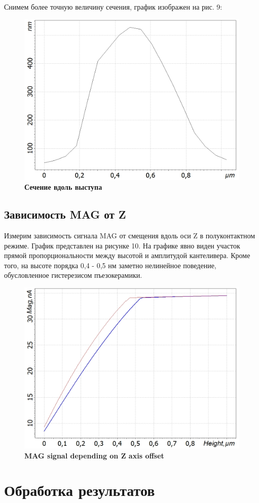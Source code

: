 \documentclass[a4paper]{article}
\begin{document}
Снимем более точную величину сечения, график изображен на рис. 9:

 \begin{figure}[H]
\centering
	\includegraphics[width=0.6\linewidth]{curve3.jpg}
		\caption{{\bf {Сечение вдоль выступа}}}
   	\label{fig:9}
\end{figure}

\subsection{Зависимость MAG от Z}
Измерим зависимость сигнала MAG от смещения вдоль оси Z в полуконтактном режиме. График представлен на рисунке 10. На графике явно виден участок прямой пропорциональности между высотой и амплитудой кантеливера. Кроме того, на высоте порядка 0,4 - 0,5 нм заметно нелинейное поведение, обусловленное гистерезисом пъезокерамики.
 \begin{figure}[H]
\centering
	\includegraphics[width=0.6\linewidth]{curve2.jpg}
		\caption{{\bf {MAG signal depending on Z axis offset}}}
   	\label{fig:10}
\end{figure}

\section{Обработка результатов}
\end{document}
